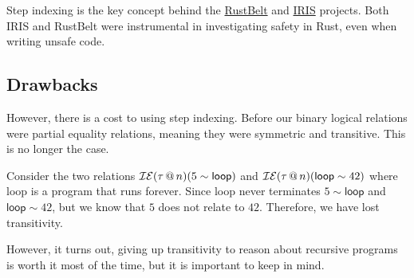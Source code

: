 \documentclass{lecturenotes}
\makeatletter
\newcommand{\inexpr}[4]{\ensuremath{\mathcal{I}\mathcal{E}(#1 \mkern3mu @ \mkern3mu #2)(#3 \sim #4})}
\makeatother
\begin{document}
Step indexing is the key concept behind the \href{https://plv.mpi-sws.org/rustbelt/}{RustBelt} and \href{https://iris-project.org/}{IRIS} projects. 
  Both IRIS and RustBelt were instrumental in investigating safety in Rust, even when writing unsafe code.
\subsection{Drawbacks}

However, there is a cost to using step indexing. 
  Before our binary logical relations were partial equality relations, meaning they were symmetric and transitive. 
  This is no longer the case. 

Consider the two relations $\inexpr{\tau}{n}{5}{\textsf{loop}}$ and $\inexpr{\tau}{n}{\textsf{loop}}{42}$ where \textsf{loop} is a program that runs forever. 
  Since \textsf{loop} never terminates $5 \sim \textsf{loop}$ and $\textsf{loop} \sim 42$, but we know that $5$ does not relate to $42$. 
  Therefore, we have lost transitivity. 

However, it turns out, giving up transitivity to reason about recursive programs is worth it most of the time, but it is important to keep in mind. 
\end{document}
